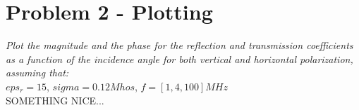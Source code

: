 \section{Problem 2 - Plotting}
\textit{ Plot the magnitude and the phase for the reflection and transmission coefficients as a function of the incidence angle for both vertical and horizontal polarization, assuming that:}\\

$eps_r=15$, $sigma=0.12Mhos$, $f=[1,4,100]MHz$\\

SOMETHING NICE...